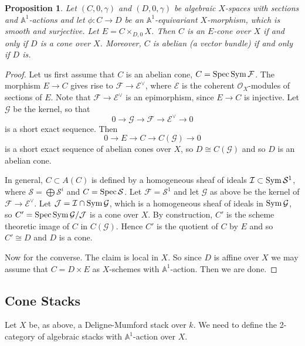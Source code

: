 \documentclass[11pt]{article}
\theoremstyle{plain}
\newtheorem{prop}{Proposition}[section]
\theoremstyle{definition}
\newenvironment{pf}{\begin{proof}}{\end{proof}}
\newcommand{\dual}[1]{{{#1}^{\vee}}}
\newcommand{\aaa}{{\mathbb{A}}}
\renewcommand{\O}{{\mathcal{O}}}
\newcommand{\eE}{{\mathcal{E}}}
\newcommand{\iI}{{\mathcal{I}}}
\newcommand{\jJ}{{\mathcal{J}}}
\newcommand{\gG}{{\mathcal{G}}}
\newcommand{\fF}{{\mathcal{F}}}
\newcommand{\sS}{{\mathcal{S}}}
\newcommand{\spec}{\mathop{\rm Spec}\nolimits}
\newcommand{\Sym}{\mathop{\rm Sym}\nolimits}
\newcommand{\ses}[5]
{0\longrightarrow#1\stackrel{#2}{ \longrightarrow}#3\stackrel{#4}{
\longrightarrow}#5\longrightarrow0}
\theoremstyle{plain}
\theoremstyle{definition}
\theoremstyle{remark}
\begin{document}
\begin{prop} \label{lcc}
Let \((C,0,\gamma)\) and \((D,0,\gamma)\) be algebraic \(X\)-spaces with
sections and \(\aaa^1\)-actions and let \(\phi:C\rightarrow D\) be an
\(\aaa^1\)-equivariant \(X\)-morphism, which is smooth and surjective. Let
\(E=C\times_{D,0}X\).  Then \(C\) is an \(E\)-cone over \(X\) if and only if
\(D\) is a cone over \(X\). Moreover, \(C\) is abelian (a vector bundle) if
and only if \(D\) is.
\end{prop}
\begin{pf}
Let us first assume that \(C\) is an abelian cone, \(C=\spec\Sym\fF\).
The morphism \(E\rightarrow C\) gives rise to
\(\fF\rightarrow\dual{\eE}\), where \(\eE\) is the coherent \(\O_X\)-modules
of sections of \(E\). Note that \(\fF\rightarrow\dual{\eE}\) is an
epimorphism, since \(E\rightarrow C\) is injective. Let \(\gG\) be the
kernel, so that
\[
\ses{\gG}{}{\fF}{}{\dual{\eE}}
\]
is a short exact sequence. Then
\[
\ses{E}{}{C}{}{C(\gG)}
\]
is a short exact sequence of abelian cones over \(X\),
so \(D\cong C(\gG)\) and so \(D\) is an abelian cone.

In general, \(C\subset A(C)\) is defined by a homogeneous sheaf of ideals
\(\iI\subset\Sym \sS^1\), where \(\sS=\bigoplus\sS^i\) and \(C=\spec\sS\). Let
\(\fF=\sS^1\) and let \(\gG\) as above be the kernel of
\(\fF\rightarrow\dual{\eE}\). Let \(\jJ=\iI\cap\Sym\gG\), which is a homogeneous
sheaf of ideals in
\(\Sym\gG\), so \(C'=\spec\Sym\gG/\jJ\) is a cone over \(X\). By construction, \(C'\)
is
the scheme theoretic image of \(C\) in \(C(\gG)\). Hence \(C'\) is the quotient of
\(C\)
by \(E\) and so \(C'\cong D\) and
\(D\) is a cone.

Now for the converse. The claim is local in \(X\). So since \(D\) is affine over
\(X\)
we may assume that
\(C=D\times E\) as \(X\)-schemes with \(\aaa^1\)-action. Then we are done.
\end{pf}

\subsection{Cone Stacks}

Let \(X\) be, as above, a Deligne-Mumford stack over \(k\). We need to
define the 2-category of algebraic stacks with \(\aaa^1\)-action over
\(X\).
\end{document}
